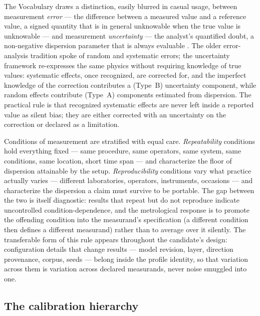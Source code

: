 The Vocabulary draws a distinction, easily blurred in casual usage, between measurement \emph{error} --- the difference between a measured value and a reference value, a signed quantity that is in general unknowable when the true value is unknowable --- and measurement \emph{uncertainty} --- the analyst's quantified doubt, a non-negative dispersion parameter that is always evaluable \cite{vim,gum}. The older error-analysis tradition spoke of random and systematic errors; the uncertainty framework re-expresses the same physics without requiring knowledge of true values: systematic effects, once recognized, are corrected for, and the imperfect knowledge of the correction contributes a (Type~B) uncertainty component, while random effects contribute (Type~A) components estimated from dispersion. The practical rule is that recognized systematic effects are never left inside a reported value as silent bias; they are either corrected with an uncertainty on the correction or declared as a limitation.

Conditions of measurement are stratified with equal care. \emph{Repeatability} conditions hold everything fixed --- same procedure, same operators, same system, same conditions, same location, short time span --- and characterize the floor of dispersion attainable by the setup. \emph{Reproducibility} conditions vary what practice actually varies --- different laboratories, operators, instruments, occasions --- and characterize the dispersion a claim must survive to be portable. The gap between the two is itself diagnostic: results that repeat but do not reproduce indicate uncontrolled condition-dependence, and the metrological response is to promote the offending condition into the measurand's specification (a different condition then defines a different measurand) rather than to average over it silently. The transferable form of this rule appears throughout the candidate's design: configuration details that change results --- model revision, layer, direction provenance, corpus, seeds --- belong inside the profile identity, so that variation across them is variation across declared measurands, never noise smuggled into one.

\subsection{The calibration hierarchy}\label{ch02:metrology:hierarchy}

